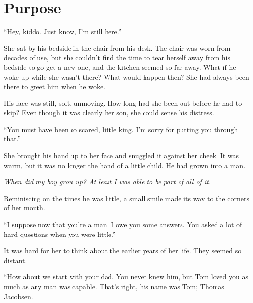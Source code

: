 \chapter*{Purpose}



``Hey, kiddo. Just know, I'm still here.''

She sat by his bedside in the chair from his desk. The chair was worn from decades of use, but she couldn't find the time to tear herself away from his bedside to go get a new one, and the kitchen seemed so far away. What if he woke up while she wasn't there? What would happen then? She had always been there to greet him when he woke.

His face was still, soft, unmoving. How long had she been out before he had to skip? Even though it was clearly her son, she could sense his distress.

``You must have been so scared, little king. I'm sorry for putting you through that.''

She brought his hand up to her face and snuggled it against her cheek. It was warm, but it was no longer the hand of a little child. He had grown into a man.

\textit{When did my boy grow up? At least I was able to be part of all of it.}

Reminiscing on the times he was little, a small smile made its way to the corners of her mouth.

``I suppose now that you're a man, I owe you some answers. You asked a lot of hard questions when you were little.''

It was hard for her to think about the earlier years of her life. They seemed so distant.

``How about we start with your dad. You never knew him, but Tom loved you as much as any man was capable. That's right, his name was Tom; Thomas Jacobsen.

